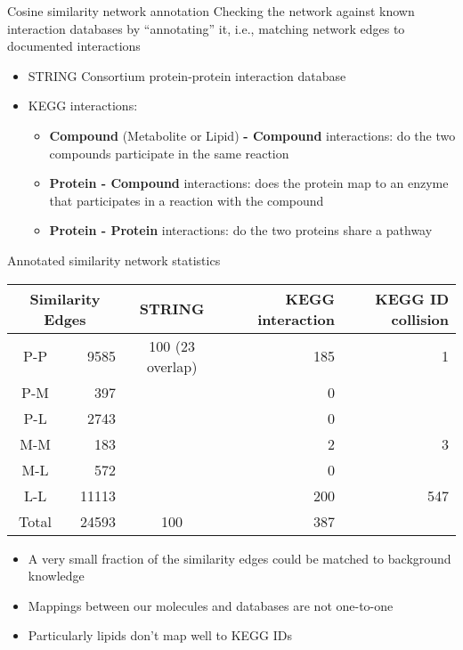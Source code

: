 \documentclass[aspectratio=169]{beamer}
\begin{document}

\begin{frame}{Cosine similarity network annotation}
Checking the network against known interaction databases by ``annotating'' it, i.e., matching network edges to documented interactions

\begin{itemize}
	\item STRING Consortium protein-protein interaction database
	\item KEGG interactions:
	\begin{itemize}
		\item \textbf{Compound} (Metabolite or Lipid) \textbf{- Compound} interactions: do the two compounds participate in the same reaction
		\item \textbf{Protein - Compound} interactions: does the protein map to an enzyme that participates in a reaction with the compound
		\item \textbf{Protein - Protein} interactions: do the two proteins share a pathway
	\end{itemize}
\end{itemize}

\end{frame}


\begin{frame}{Annotated similarity network statistics}
\centering
\begin{tabular}{c|r|crr}
	\multicolumn{2}{c}{Similarity Edges} & STRING & KEGG interaction & KEGG ID collision \\ \hline
	P-P & 9585 & 100 (23 overlap) & 185 & 1 \\
	P-M & 397 & & 0 & \\
	P-L & 2743 & & 0 & \\
	M-M & 183 & & 2 & 3 \\
	M-L & 572 & & 0 & \\
	L-L & 11113 & & 200 & 547 \\ \hline
	Total & 24593 & 100 & 387
\end{tabular}

\pause
\vfill
\begin{itemize}
	\item A very small fraction of the similarity edges could be matched to background knowledge
	\item Mappings between our molecules and databases are not one-to-one
	\item Particularly lipids don't map well to KEGG IDs
\end{itemize}
\end{frame}
\end{document}
